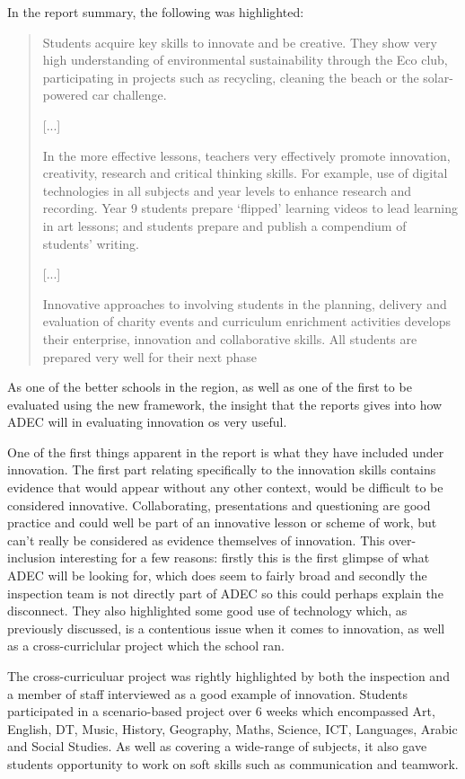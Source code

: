 In the report summary, the following was highlighted:
\begin{quote}
Students acquire key skills to innovate and be creative. They show very high understanding of environmental sustainability through the Eco club, participating in projects such as recycling, cleaning the beach or the solar-powered car challenge.

[...]

In the more effective lessons, teachers very effectively promote innovation, creativity, research and critical thinking skills. For example, use of digital technologies in all subjects and year levels to enhance research and recording. Year 9 students prepare ‘flipped’ learning videos to lead learning in art lessons; and students prepare and publish a compendium of students’ writing.

[...]

Innovative approaches to involving students in the planning, delivery and evaluation of charity events and curriculum enrichment activities develops their enterprise, innovation and collaborative skills. All students are prepared very well for their next phase
\end{quote}

As one of the better schools in the region, as well as one of the first to be evaluated using the new framework, the insight that the reports gives into how ADEC will in evaluating innovation os very useful.

One of the first things apparent in the report is what they have included under innovation. The first part relating specifically to the innovation skills contains evidence that would appear without any other context, would be difficult to be considered innovative. Collaborating, presentations and questioning are good practice and could well be part of an innovative lesson or scheme of work, but can't really be considered as evidence themselves of innovation. This over-inclusion interesting for a few reasons: firstly this is the first glimpse of what ADEC will be looking for, which does seem to fairly broad and secondly the inspection team is not directly part of ADEC so this could perhaps explain the disconnect. They also highlighted some good use of technology which, as previously discussed, is a contentious issue when it comes to innovation, as well as a cross-curriclular project which the school ran.

The cross-curriculuar project was rightly highlighted by both the inspection and a member of staff interviewed as a good example of innovation. Students participated in a scenario-based project over 6 weeks which encompassed Art, English, DT, Music, History, Geography, Maths, Science, ICT, Languages, Arabic and Social Studies. As well as covering a wide-range of subjects, it also gave students opportunity to work on soft skills such as communication and teamwork. 

